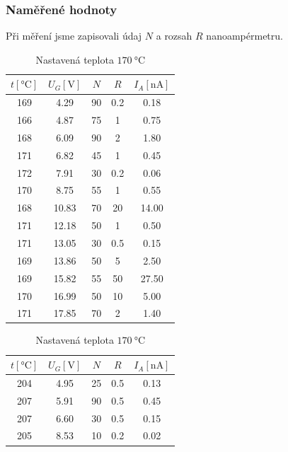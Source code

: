 \documentclass[titlepage]{article}
\begin{document}
\subsubsection{Naměřené hodnoty}
Při měření jsme zapisovali údaj $N$ a rozsah $R$ nanoampérmetru.
\begin{table}[H]
    \begin{minipage}{.49 \textwidth}
      \centering
        \begin{tabular}{c||c|c|c|c}
            $t [\si{\celsius}]$ & $U_G [\si{\volt}]$ & $N$ & $R$ & $I_A [\si{\nano\ampere}]$ \\ \hline\hline
            169 & 4.29 & 90 & 0.2 & 0.18 \\ \hline
            166 & 4.87 & 75 & 1 & 0.75 \\ \hline
            168 & 6.09 & 90 & 2 & 1.80 \\ \hline
            171 & 6.82 & 45 & 1 & 0.45 \\ \hline
            172 & 7.91 & 30 & 0.2 & 0.06 \\ \hline
            170 & 8.75 & 55 & 1 & 0.55 \\ \hline
            168 & 10.83 & 70 & 20 & 14.00 \\ \hline
            171 & 12.18 & 50 & 1 & 0.50 \\ \hline
            171 & 13.05 & 30 & 0.5 & 0.15 \\ \hline
            169 & 13.86 & 50 & 5 & 2.50 \\ \hline
            169 & 15.82 & 55 & 50 & 27.50 \\ \hline
            170 & 16.99 & 50 & 10 & 5.00 \\ \hline
            171 & 17.85 & 70 & 2 & 1.40
        \end{tabular}
        \caption{Nastavená teplota $170\ \si{\celsius}$}
    \end{minipage}%
    \begin{minipage}{.49 \textwidth}
      \centering
        \begin{tabular}{c||c|c|c|c}
            $t [\si{\celsius}]$ & $U_G [\si{\volt}]$ & $N$ & $R$ & $I_A [\si{\nano\ampere}]$ \\ \hline\hline
            204 & 4.95 & 25 & 0.5 & 0.13 \\ \hline
            207 & 5.91 & 90 & 0.5 & 0.45 \\ \hline
            207 & 6.60 & 30 & 0.5 & 0.15 \\ \hline
            205 & 8.53 & 10 & 0.2 & 0.02 \\ \hline

\end{tabular}
\end{minipage}
\end{table}
\end{document}
